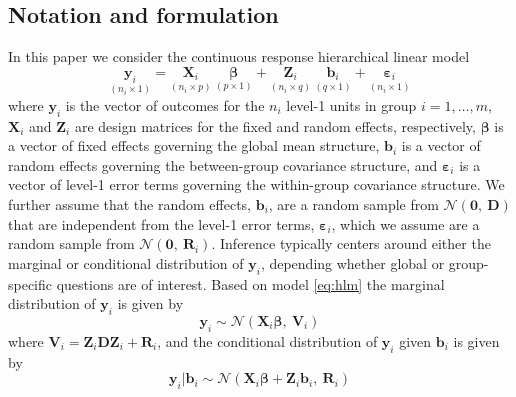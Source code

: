 \documentclass{article} %
\begin{document}
\subsection{Notation and formulation}
In this paper we consider the continuous response hierarchical linear model
%
\begin{equation}\label{eq:hlm}
	\underset{(n_i \times 1)}{\bm{y}_i} = \underset{(n_i \times p)}{\bm{X}_i} \ \underset{(p \times 1)}{\bm{\beta}} + \underset{(n_i \times q)}{\bm{Z}_i} \ \underset{(q \times 1)}{\bm{b}_i} + \underset{(n_i \times 1)}{\bm{\varepsilon}_i}
\end{equation}
%
where $\bm{y}_i$ is the vector of outcomes for the $n_i$ level-1 units in group $i=1, \ldots, m$, $\bm{X}_i$ and $\bm{Z}_i$ are design matrices for the fixed and random effects, respectively, $\bm{\beta}$ is a vector of fixed effects governing the global mean structure, $\bm{b}_i$ is a vector of random effects governing the between-group covariance structure, and $\bm{\varepsilon}_i$ is a vector of level-1 error terms governing the within-group covariance structure. We further assume that the random effects, $\bm{b}_i$, are a random sample from $\mathcal{N}(\bm{0},\ \bm{D})$ that are independent from the level-1 error terms, $\bm{\varepsilon}_i$, which we assume are a random sample from $\mathcal{N}(\bm{0},\ \bm{R}_i)$. 
Inference typically centers around either the marginal or conditional distribution of $\bm{y}_i$, depending whether global or group-specific questions are of interest.
Based on model \eqref{eq:hlm} the marginal distribution of $\bm{y}_i$ is given by
%
\begin{equation}\label{eq:marginalmod}
\bm{y}_i \sim \mathcal{N}\left(\bm{X}_i\bm{\beta},\ \bm{V}_i \right)
\end{equation}
%
where $\bm{V}_i = \bm{Z}_i \bm{DZ}_i + \bm{R}_i$, and the conditional distribution of $\bm{y}_i$ given $\bm{b}_i$ is given by
%
\begin{equation}\label{eq:conditionalmod}
\bm{y}_i | \bm{b}_i \sim \mathcal{N}\left(\bm{X}_i\bm{\beta} + \bm{Z}_i \bm{b}_i, \ \bm{R}_i \right)
\end{equation}
%
\end{document}
